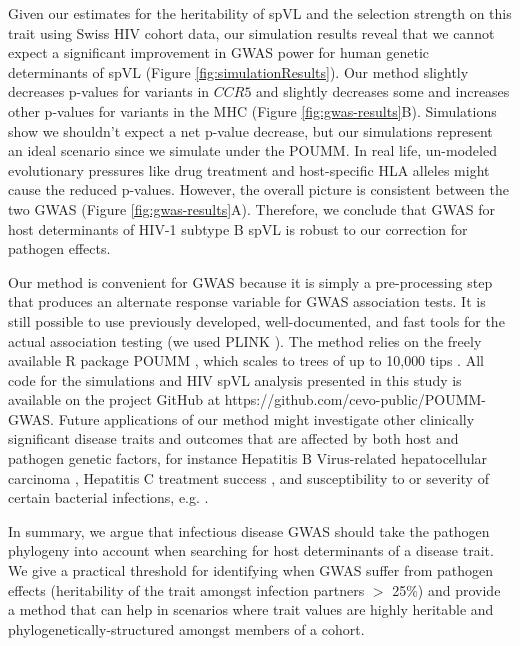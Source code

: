 \documentclass[11pt]{article}
\begin{document}
\begin{linenumbers}
Given our estimates for the heritability of spVL and the selection strength on this trait using Swiss HIV cohort data, our simulation results reveal that we cannot expect a significant improvement in GWAS power for human genetic determinants of spVL (Figure \ref{fig:simulationResults}). Our method slightly decreases p-values for variants in $CCR5$ and slightly decreases some and increases other p-values for variants in the MHC (Figure \ref{fig:gwas-results}B). Simulations show we shouldn't expect a net p-value decrease, but our simulations represent an ideal scenario since we simulate under the POUMM. In real life, un-modeled evolutionary pressures like drug treatment and host-specific HLA alleles might cause the reduced p-values. However, the overall picture is consistent between the two GWAS (Figure \ref{fig:gwas-results}A). Therefore, we conclude that GWAS for host determinants of HIV-1 subtype B spVL is robust to our correction for pathogen effects. 

Our method is convenient for GWAS because it is simply a pre-processing step that produces an alternate response variable for GWAS association tests. It is still possible to use previously developed, well-documented, and fast tools for the actual association testing (we used PLINK \citep{Chang2015}). The method relies on the freely available R package POUMM \citep{Mitov2017a-POUMM}, which scales to trees of up to 10,000 tips \citep{Mitov2019}. All code for the simulations and HIV spVL analysis presented in this study is available on the project GitHub at https://github.com/cevo-public/POUMM-GWAS. Future applications of our method might investigate other clinically significant disease traits and outcomes that are affected by both host and pathogen genetic factors, for instance Hepatitis B Virus-related hepatocellular carcinoma \citep{An2018HostCarcinoma}, Hepatitis C treatment success \citep{Ansari2017Genome-to-genomeVirus}, and susceptibility to or severity of certain bacterial infections, e.g. \cite{Messina2016ImpactInfections, Donnenberg2015BacterialStudies}.

In summary, we argue that infectious disease GWAS should take the pathogen phylogeny into account when searching for host determinants of a disease trait. We give a practical threshold for identifying when GWAS suffer from pathogen effects (heritability of the trait amongst infection partners $>$ 25\%) and provide a method that can help in scenarios where trait values are highly heritable and phylogenetically-structured amongst members of a cohort.


\end{linenumbers}
\end{document}
